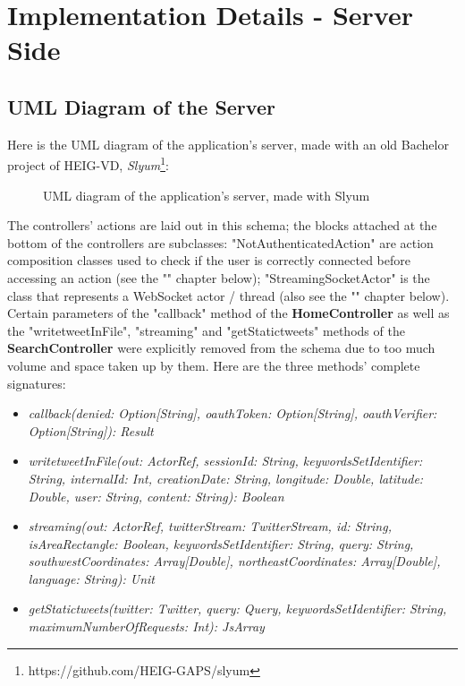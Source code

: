 \documentclass[a4paper,11pt]{report}
\begin{document}
\section{Implementation Details - Server Side}
\subsection{UML Diagram of the Server}
Here is the UML diagram of the application's server, made with an old Bachelor project of HEIG-VD, \emph{Slyum}\footnote{https://github.com/HEIG-GAPS/slyum}:
\begin{figure}[H]
\begin{center}
\caption{UML diagram of the application's server, made with Slyum}
\end{center}
\end{figure}
The controllers' actions are laid out in this schema; the blocks attached at the bottom of the controllers are subclasses: "NotAuthenticatedAction" are action composition classes used to check if the user is correctly connected before accessing an action (see the "" chapter below); "StreamingSocketActor" is the class that represents a WebSocket actor / thread (also see the "" chapter below).
Certain parameters of the "callback" method of the \textbf{HomeController} as well as the "writetweetInFile", "streaming" and "getStatictweets" methods of the \textbf{SearchController} were explicitly removed from the schema due to too much volume and space taken up by them. Here are the three methods' complete signatures:
\begin{itemize}
\item \emph{callback(denied: Option[String], oauthToken: Option[String], oauthVerifier: Option[String]): Result}
\item \emph{writetweetInFile(out: ActorRef, sessionId: String, keywordsSetIdentifier: String, internalId: Int, creationDate: String, longitude: Double, latitude: Double, user: String, content: String): Boolean}
\item \emph{streaming(out: ActorRef, twitterStream: TwitterStream, id: String, isAreaRectangle: Boolean, keywordsSetIdentifier: String, query: String, southwestCoordinates: Array[Double], northeastCoordinates: Array[Double], language: String): Unit}
\item \emph{getStatictweets(twitter: Twitter, query: Query, keywordsSetIdentifier: String, maximumNumberOfRequests: Int): JsArray}
\end{itemize}
\end{document}
